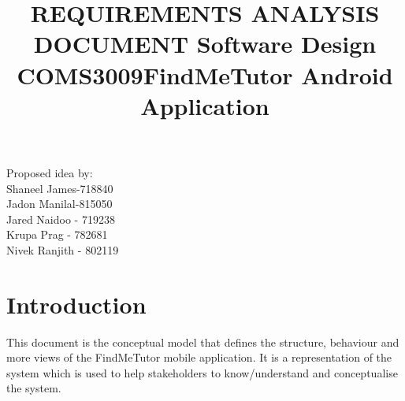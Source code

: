 \documentclass[12pt]{article}
\begin{document}
\title{\textbf{REQUIREMENTS ANALYSIS DOCUMENT }}
\maketitle

\begin{center}
\title{\textbf{Software Design COMS3009}}
\maketitle 
\end{center}
\begin{center}
\title{\textbf{FindMeTutor Android Application}}
\maketitle 
\end{center}

\begin{center}
Proposed idea by:\\
Shaneel James-718840
\\Jadon Manilal-815050
\\Jared Naidoo - 719238
\\Krupa Prag - 782681
\\Nivek Ranjith - 802119
\end{center}


\newpage
\tableofcontents
\newpage


\section{\textbf{Introduction}}
\begin{flushleft}
This document is the conceptual model that defines the structure, behaviour and more views of the FindMeTutor mobile application. It is a representation of the system which is used to help stakeholders to know/understand and conceptualise the system.

\end{flushleft}
\end{document}
